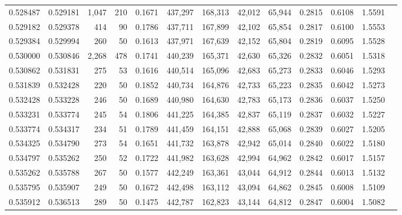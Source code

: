 \begin{tabular}{rrrrrrrrrrrrr}
0.528487 & 0.529181 & 1,047 & 210 &                                     0.1671 & 437,297 & 168,313 &  42,012 &  65,944 & 0.2815 & 0.6108 & 1.5591 \\
0.529182 & 0.529378 &   414 &  90 &                                     0.1786 & 437,711 & 167,899 &  42,102 &  65,854 & 0.2817 & 0.6100 & 1.5553 \\
0.529384 & 0.529994 &   260 &  50 &                                     0.1613 & 437,971 & 167,639 &  42,152 &  65,804 & 0.2819 & 0.6095 & 1.5528 \\
0.530000 & 0.530846 & 2,268 & 478 &                                     0.1741 & 440,239 & 165,371 &  42,630 &  65,326 & 0.2832 & 0.6051 & 1.5318 \\
0.530862 & 0.531831 &   275 &  53 &                                     0.1616 & 440,514 & 165,096 &  42,683 &  65,273 & 0.2833 & 0.6046 & 1.5293 \\
0.531839 & 0.532428 &   220 &  50 &                                     0.1852 & 440,734 & 164,876 &  42,733 &  65,223 & 0.2835 & 0.6042 & 1.5273 \\
0.532428 & 0.533228 &   246 &  50 &                                     0.1689 & 440,980 & 164,630 &  42,783 &  65,173 & 0.2836 & 0.6037 & 1.5250 \\
0.533231 & 0.533774 &   245 &  54 &                                     0.1806 & 441,225 & 164,385 &  42,837 &  65,119 & 0.2837 & 0.6032 & 1.5227 \\
0.533774 & 0.534317 &   234 &  51 &                                     0.1789 & 441,459 & 164,151 &  42,888 &  65,068 & 0.2839 & 0.6027 & 1.5205 \\
0.534325 & 0.534790 &   273 &  54 &                                     0.1651 & 441,732 & 163,878 &  42,942 &  65,014 & 0.2840 & 0.6022 & 1.5180 \\
0.534797 & 0.535262 &   250 &  52 &                                     0.1722 & 441,982 & 163,628 &  42,994 &  64,962 & 0.2842 & 0.6017 & 1.5157 \\
0.535262 & 0.535788 &   267 &  50 &                                     0.1577 & 442,249 & 163,361 &  43,044 &  64,912 & 0.2844 & 0.6013 & 1.5132 \\
0.535795 & 0.535907 &   249 &  50 &                                     0.1672 & 442,498 & 163,112 &  43,094 &  64,862 & 0.2845 & 0.6008 & 1.5109 \\
0.535912 & 0.536513 &   289 &  50 &                                     0.1475 & 442,787 & 162,823 &  43,144 &  64,812 & 0.2847 & 0.6004 & 1.5082 \\

\end{tabular}
